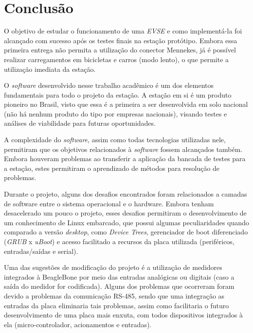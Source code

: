\chapter{Conclusão}
\label{stateofart:conclusion}

  O objetivo de estudar o funcionamento de uma \textit{\ac{EVSE}} e como implementá-la foi alcançado com sucesso após os testes finais na estação protótipo. Embora essa primeira entrega não permita a utilização do conector Mennekes, já é possível realizar carregamentos em bicicletas e carros (modo lento), o que permite a utilização imediata da estação.

  O \textit{software} desenvolvido nesse trabalho acadêmico é um dos elementos fundamentais para todo o projeto da estação. A estação em si é um produto pioneiro no Brasil, visto que essa é a primeira a ser desenvolvida em solo nacional (não há nenhum produto do tipo por empresas nacionais), visando testes e análises de viabilidade para futuras oportunidades.

  A complexidade do \textit{software}, assim como todas tecnologias utilizadas nele, permitiram que os objetivos relacionados à \textit{software} fossem alcançados também. Embora houveram problemas ao transferir a aplicação da bancada de testes para a estação, estes permitiram o aprendizado de métodos para resolução de problemas.

  Durante o projeto, alguns dos desafios encontrados foram relacionados a camadas de software entre o sistema operacional e o hardware. Embora tenham desacelerado um pouco o projeto, esses desafios permitiram o desenvolvimento de um conhecimento de Linux embarcado, que possui algumas peculiaridades quando comparado a versão \textit{desktop}, como \textit{Device Trees}, gerenciador de boot diferenciado (\textit{GRUB} x \textit{uBoot}) e acesso facilitado a recursos da placa utilizada (periféricos, entradas/saídas e serial).

  Uma das sugestões de modificação do projeto é a utilização de medidores integrados à BeagleBone por meio das entradas analógicas ou digitais (caso a saída do medidor for codificada). Alguns dos problemas que ocorreram foram devido a problemas da comunicação RS-485, sendo que uma integração as entradas da placa eliminaria tais problemas, assim como facilitaria o futuro desenvolvimento de uma placa mais enxuta, com todos dispositivos integrados à ela (micro-controlador, acionamentos e entradas).
  
